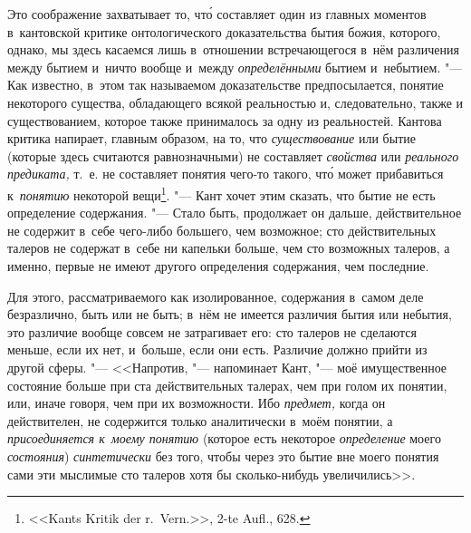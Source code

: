 Это соображение захватывает то, чт\'{о} составляет один из главных моментов
в~кантовской критике онтологического доказательства бытия божия, которого,
однако, мы здесь касаемся лишь в~отношении встречающегося в~нём различения
между бытием и~ничто вообще и~между {\em определёнными} бытием и~небытием. "---
Как известно, в~этом так называемом доказательстве предпосылается, понятие
некоторого существа, обладающего всякой реальностью и, следовательно, также и
существованием, которое также принималось за одну из реальностей. Кантова
критика напирает, главным образом, на то, что {\em существование} или бытие
(которые здесь считаются равнозначными) не составляет {\em свойства} или {\em
реального предиката,} т.~е. не составляет понятия чего-то такого, чт\'{о} может
прибавиться к~{\em понятию} некоторой вещи\footnote{<<Kants Kritik der
r.~Vern.>>, 2-te Aufl., 628.}. "--- Кант хочет этим сказать, что бытие не есть
определение содержания. "--- Стало быть, продолжает он дальше, действительное
не содержит в~себе чего-либо большего, чем возможное; сто действительных
талеров не содержат в~себе ни капельки больше, чем сто возможных талеров, а
именно, первые не имеют другого определения содержания, чем последние.

Для этого, рассматриваемого как изолированное, содержания в~самом деле
безразлично, быть или не быть; в~нём не имеется различия бытия или небытия, это
различие вообще совсем не затрагивает его: сто талеров не сделаются меньше,
если их нет, и~больше, если они есть. Различие должно прийти из другой сферы.
"--- <<Напротив, "--- напоминает Кант, "--- моё имущественное состояние больше
при ста действительных талерах, чем при голом их понятии, или, иначе говоря,
чем при их возможности. Ибо {\em предмет,} когда он действителен, не содержится
только аналитически в~моём понятии, а {\em присоединяется к~моему понятию}
(которое есть некоторое {\em определение} моего {\em состояния})
{\em синтетически} без того, чтобы через это бытие вне моего понятия сами эти
мыслимые сто талеров хотя бы сколько-нибудь увеличились>>.

